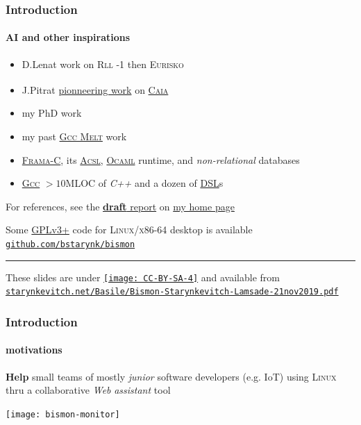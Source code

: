 \documentclass[xcolor=svgnames,final,smaller,a4]{beamer}
\begin{document}
\begin{frame}
    \frametitle{Introduction}
    \framesubtitle{AI and other inspirations}

    \begin{itemize}

    \item D.Lenat work on \textsc{Rll -1} then \textsc{Eurisko}
    \item J.Pitrat\textsuperscript{\dag} {}
      \href{http://bootstrappingartificialintelligence.fr/WordPress3/}{pionneering
        work} on \href{http://starynkevitch.net/Basile/caia-su-24feb2016.tar.bz2}{\textsc{Caia}}
    \item my PhD work {}
    \item my past \href{http://starynkevitch.net/Basile/gcc-melt/}{\textsc{Gcc Melt}} work {}
    \item \href{http://frama-c.com/}{\textsc{Frama-C}}, its
      \href{https://frama-c.com/acsl_tutorial_index.html}{\textsc{Acsl}}, \href{http://ocaml.org}{\textsc{Ocaml}} runtime,
      and \textit{non-relational} databases
    \item \href{http://gcc.gnu.org/}{\textsc{Gcc}}  $> 10$MLOC of \textit{C++} {}
 and a dozen of \href{https://en.wikipedia.org/wiki/Domain-specific_language}{DSL}s
    \end{itemize}

    For references, see the \href{http://starynkevitch.net/Basile/bismon-chariot-doc.pdf}{{\Bismon} \textbf{draft} report} on \href{http://starynkevitch.net/Basile/}{my home page}

    Some \href{https://www.gnu.org/licenses/gpl-3.0.en.html}{GPLv3+} code for \textsc{Linux/x86-64} desktop is available
    \href{http://github.com/bstarynk/bismon}{\texttt{github.com/bstarynk/bismon}}

    \hrule
    
    These slides are under \href{https://creativecommons.org/licenses/by-sa/4.0/}{\texttt{[image: CC-BY-SA-4]}}  and available from \href{http://starynkevitch.net/Basile/Bismon-Starynkevitch-Lamsade-21nov2019.pdf}{\texttt{starynkevitch.net/Basile/Bismon-Starynkevitch-Lamsade-21nov2019.pdf}}

    
    
\end{frame}

\begin{frame}
    \frametitle{Introduction}
    \framesubtitle{motivations}

    \textbf{Help} small teams of mostly \emph{junior} software developers (e.g. IoT) using \textsc{Linux} thru a collaborative \textit{Web} \emph{assistant} tool

    \begin{center}
      \texttt{[image: bismon-monitor]}
    \end{center}
    
\end{frame}
\end{document}
